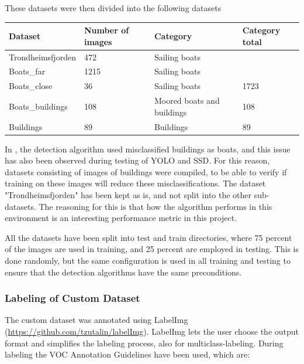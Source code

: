 \newpage

These datasets were then divided into the following datasets

\begin{table}[h!]
\begin{tabular}{l|l|l|l}
Dataset           & Number of images & Category                   & Category total \\ \hline
Trondheimsfjorden & 472              & Sailing boats              &                \\
Boats\_far        & 1215             & Sailing boats              &                \\
Boats\_close      & 36               & Sailing boats              & 1723           \\ \hline
Boats\_buildings  & 108              & Moored boats and buildings & 108            \\ \hline
Buildings         & 89               & Buildings                  & 89            
\end{tabular}
\end{table}

In \citep{Tangstad2017}, the detection algorithm used misclassified buildings as boats, and this issue has also been observed during testing of YOLO and SSD. For this reason, datasets consisting of images of buildings were compiled, to be able to verify if training on these images will reduce these misclassifications. The dataset "Trondheimsfjorden" has been kept as is, and not split into the other sub-datasets. The reasoning for this is that how the algorithm performs in this environment is an interesting performance metric in this project. 


\vspace{3mm}

All the datasets have been split into test and train directories, where 75 percent of the images are used in training, and 25 percent are employed in testing. This is done randomly, but the same configuration is used in all training and testing to ensure that the detection algorithms have the same preconditions.

\subsubsection{Labeling of Custom Dataset}
\label{sec:labeling}
The custom dataset was annotated using LabelImg (\url{https://github.com/tzutalin/labelImg}). LabelImg lets the user choose the output format and simplifies the labeling process, also for multiclass-labeling. During labeling the VOC Annotation Guidelines \citep{Everingham2012} have been used, which are:

